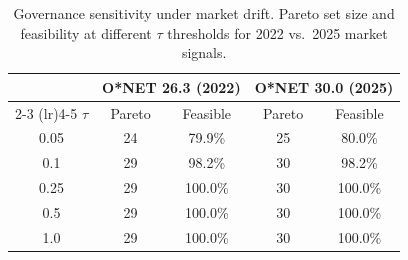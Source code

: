 \begin{table}[t]
\centering
\small
\caption{Governance sensitivity under market drift. Pareto set size and feasibility at different $\tau$ thresholds for 2022 vs.\ 2025 market signals.}
\label{tab:governance_drift}
\begin{tabular}{@{}ccccc@{}}
\toprule
& \multicolumn{2}{c}{\bf O*NET 26.3 (2022)} & \multicolumn{2}{c}{\bf O*NET 30.0 (2025)} \\
\cmidrule(lr){2-3} \cmidrule(lr){4-5}
$\tau$ & Pareto & Feasible & Pareto & Feasible \\
\midrule
0.05 & 24 & 79.9\% & 25 & 80.0\% \\
0.1 & 29 & 98.2\% & 30 & 98.2\% \\
0.25 & 29 & 100.0\% & 30 & 100.0\% \\
0.5 & 29 & 100.0\% & 30 & 100.0\% \\
1.0 & 29 & 100.0\% & 30 & 100.0\% \\
\bottomrule
\end{tabular}
\end{table}
